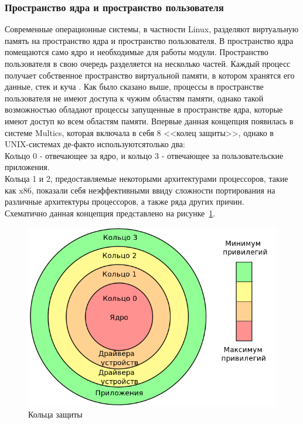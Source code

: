 \subsubsection{Пространство ядра и пространство пользователя}\label{subsec:----}
Современные операционные системы, в частности Linux, разделяют виртуальную память на пространство ядра и пространство пользователя.
В пространство ядра помещаются само ядро и необходимые для работы модули.
Пространство пользователя в свою очередь разделяется на несколько частей.
Каждый процесс получает собственное пространство виртуальной памяти, в котором хранятся его данные, стек и куча .
Как было сказано выше, процессы в пространстве пользователя не имеют доступа к чужим областям памяти, однако такой возможностью обладают процессы запущенные в пространстве ядра, которые имеют доступ ко всем областям памяти.
Впервые данная концепция появилась в системе Multics, которая включала в себя 8 <<колец защиты>>\footnotemark, однако в UNIX-системах де-факто используютсятолько два:
\\
Кольцо 0 - отвечающее за ядро, и кольцо 3 - отвечающее за пользовательские приложения.
\\
Кольца 1 и 2, предоставляемые некоторыми архитектурами процессоров, такие как x86, показали себя неэффективными ввиду сложности портирования на различные архитектуры процессоров, а также ряда других причин.
\\
Схематично данная концепция представлено на рисунке~\ref{fig:rings}.


\begin{figure}[H]
    \centering
    \includegraphics[scale=0.5,width=\textwidth]{inc/img/rings}
    \caption{Кольца защиты\cite{rings-pic}}
    \label{fig:rings}
\end{figure}

